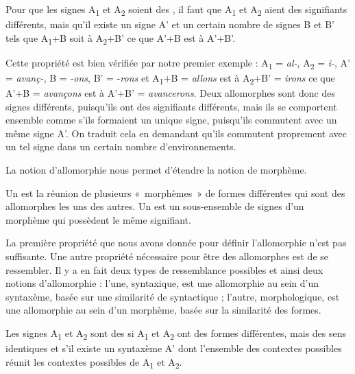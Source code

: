 \begin{styleLivreImportant}
Pour que les signes A\textsubscript{1} et A\textsubscript{2} soient des , il faut que A\textsubscript{1} et A\textsubscript{2} aient des signifiants différents, mais qu’il existe un signe A’ et un certain nombre de signes B et B’ tels que A\textsubscript{1}+B soit à A\textsubscript{2}+B’ ce que A’+B est à A’+B’.
\end{styleLivreImportant}

Cette propriété est bien vérifiée par notre premier exemple : A\textsubscript{1} = \textit{al-}, A\textsubscript{2} = \textit{i-}, A’ = \textit{avanç-}, B = \textit{{}-ons}, B’ = -\textit{rons} et A\textsubscript{1}+B = \textit{allons} est à A\textsubscript{2}+B’ = \textit{irons} ce que A’+B = \textit{avançons} est à A’+B’ = \textit{avancerons}. Deux allomorphes sont donc des signes différents, puisqu’ils ont des signifiants différents, mais ils se comportent ensemble comme s’ils formaient un unique signe, puisqu’ils commutent avec un même signe A’. On traduit cela en demandant qu’ils commutent proprement avec un tel signe dans un certain nombre d’environnements.

La notion d’allomorphie nous permet d’étendre la notion de morphème.

\begin{styleLivreImportant}
Un  est la réunion de plusieurs «~morphèmes~» de formes différentes qui sont des allomorphes les uns des autres. Un  est un sous-ensemble de signes d’un morphème qui possèdent le même signifiant.
\end{styleLivreImportant}

La première propriété que nous avons donnée pour définir l’allomorphie n’est pas suffisante. Une autre propriété nécessaire pour être des allomorphes est de se ressembler. Il y a en fait deux types de ressemblance possibles et ainsi deux notions d’allomorphie : l’une, syntaxique, est une allomorphie au sein d’un syntaxème, basée sur une similarité de syntactique ; l’autre, morphologique, est une allomorphie au sein d’un morphème, basée sur la similarité des formes.

\begin{styleLivreImportant}
Les signes A\textsubscript{1} et A\textsubscript{2} sont des \textbf{ }si A\textsubscript{1} et A\textsubscript{2} ont des formes différentes, mais des sens identiques et s’il existe un syntaxème A’ dont l’ensemble des contextes possibles réunit les contextes possibles de A\textsubscript{1} et A\textsubscript{2}.
\end{styleLivreImportant}

